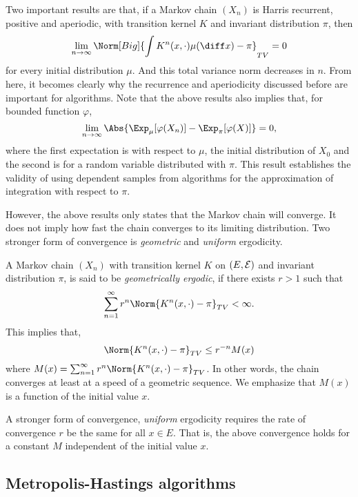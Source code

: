 Two important results are that, if a Markov chain $(X_n)$ is Harris recurrent,
positive and aperiodic, with transition kernel $K$ and invariant distribution
$\pi$, then
\begin{equation}
  \lim_{n\to\infty}\Norm[Big]{
    \int K^n(x,\cdot)\mu(\diff x) - \pi}_{TV} = 0
\end{equation}
for every initial distribution $\mu$. And this total variance norm decreases
in $n$. From here, it becomes clearly why the recurrence and aperiodicity
discussed before are important for \mcmc algorithms. Note that the above
results also implies that, for bounded function $\varphi$,
\begin{equation}
  \lim_{n\to\infty}\Abs{\Exp_{\mu}[\varphi(X_n)] - \Exp_{\pi}[\varphi(X)]}
  = 0,
\end{equation}
where the first expectation is with respect to $\mu$, the initial
distribution of $X_0$ and the second is for a random variable distributed with
$\pi$. This result establishes the validity of using dependent samples from
\mcmc algorithms for the approximation of integration with respect to $\pi$.

However, the above results only states that the Markov chain will converge. It
does not imply how fast the chain converges to its limiting distribution.  Two
stronger form of convergence is \emph{geometric} and \emph{uniform}
ergodicity.

A Markov chain $(X_n)$ with transition kernel $K$ on $(E,\mathcal{E})$ and invariant
distribution $\pi$, is said to be \emph{geometrically ergodic}, if there
exists $r > 1$ such that
\begin{equation}
  \sum_{n=1}^{\infty} r^n\Norm{K^n(x,\cdot)-\pi}_{TV} <\infty.
\end{equation}
This implies that,
\begin{equation}
  \Norm{K^n(x,\cdot)-\pi}_{TV}\le r^{-n}M(x)
\end{equation}
where $M(x) = \sum_{n=1}^{\infty} r^n\Norm{K^n(x,\cdot)-\pi}_{TV}$. In other
words, the chain converges at least at a speed of a geometric sequence. We
emphasize that $M(x)$ is a function of the initial value $x$.

A stronger form of convergence, \emph{uniform} ergodicity requires the rate of
convergence $r$ be the same for all $x\in E$. That is, the above convergence
holds for a constant $M$ independent of the initial value $x$.

\subsection{Metropolis-Hastings algorithms}
\label{sub:Metropolis-Hastings algorithms}

